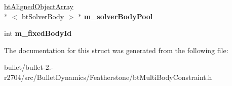 \begin{DoxyCompactItemize}
\item 
\hypertarget{structbt_multi_body_jacobian_data_a76fa294995a5994eac9f9494b1045b10}{\hyperlink{classbt_aligned_object_array}{bt\+Aligned\+Object\+Array}\\*
$<$ bt\+Solver\+Body $>$ $\ast$ {\bfseries m\+\_\+solver\+Body\+Pool}}\label{structbt_multi_body_jacobian_data_a76fa294995a5994eac9f9494b1045b10}

\item 
\hypertarget{structbt_multi_body_jacobian_data_a547c8a3ea2363e7ca6707c2369330593}{int {\bfseries m\+\_\+fixed\+Body\+Id}}\label{structbt_multi_body_jacobian_data_a547c8a3ea2363e7ca6707c2369330593}

\end{DoxyCompactItemize}


The documentation for this struct was generated from the following file\+:\begin{DoxyCompactItemize}
\item 
bullet/bullet-\/2.-\/r2704/src/\+Bullet\+Dynamics/\+Featherstone/bt\+Multi\+Body\+Constraint.\+h\end{DoxyCompactItemize}

